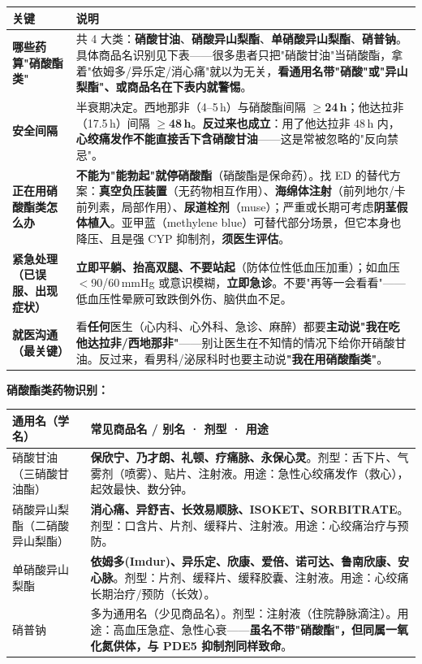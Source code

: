 \documentclass[12pt,UTF8,openany]{ctexbook}
\begin{document}
\begin{tabularx}{\textwidth}{l X}
\toprule
\textbf{关键} & \textbf{说明} \\
\midrule
\textbf{哪些药算"硝酸酯类"} & 共 4 大类：\textbf{硝酸甘油}、\textbf{硝酸异山梨酯}、\textbf{单硝酸异山梨酯}、\textbf{硝普钠}。具体商品名识别见下表——很多患者只把"硝酸甘油"当硝酸酯，拿着"依姆多/异乐定/消心痛"就以为无关，\textbf{看通用名带"硝酸"或"异山梨酯"、或商品名在下表内就警惕}。 \\
\textbf{安全间隔} & 半衰期决定。西地那非（4--5\,h）与硝酸酯间隔\textbf{ $\ge$24\,h}；他达拉非（17.5\,h）间隔\textbf{ $\ge$48\,h}。\textbf{反过来也成立}：用了他达拉非 48\,h 内，\textbf{心绞痛发作不能直接舌下含硝酸甘油}——这是常被忽略的"反向禁忌"。 \\
\textbf{正在用硝酸酯类怎么办} & \textbf{不能为"能勃起"就停硝酸酯}（硝酸酯是保命药）。找 ED 的替代方案：\textbf{真空负压装置}（无药物相互作用）、\textbf{海绵体注射}（前列地尔/卡前列素，局部作用）、\textbf{尿道栓剂}（muse）；严重或长期可考虑\textbf{阴茎假体植入}。亚甲蓝（methylene blue）可替代部分场景，但它本身也降压、且是强 CYP 抑制剂，\textbf{须医生评估}。 \\
\textbf{紧急处理（已误服、出现症状）} & \textbf{立即平躺、抬高双腿、不要站起}（防体位性低血压加重）；如血压 $<$90/60\,mmHg 或意识模糊，\textbf{立即急诊}。不要"再等一会看看"——低血压性晕厥可致跌倒外伤、脑供血不足。 \\
\textbf{就医沟通（最关键）} & 看\textbf{任何}医生（心内科、心外科、急诊、麻醉）都要\textbf{主动说"我在吃他达拉非/西地那非"}——别让医生在不知情的情况下给你开硝酸甘油。反过来，看男科/泌尿科时也要主动说\textbf{"我在用硝酸酯类"}。 \\
\bottomrule
\end{tabularx}

\textbf{硝酸酯类药物识别：}

\begin{tabularx}{\textwidth}{p{3.6cm} X}
\toprule
\textbf{通用名（学名）} & \textbf{常见商品名 / 别名 · 剂型 · 用途} \\
\midrule
硝酸甘油（三硝酸甘油酯） & \textbf{保欣宁、乃才朗、礼顿、疗痛脉、永保心灵}。剂型：舌下片、气雾剂（喷雾）、贴片、注射液。用途：急性心绞痛发作（救心），起效最快、数分钟。 \\
硝酸异山梨酯（二硝酸异山梨酯） & \textbf{消心痛、异舒吉、长效易顺脉、ISOKET、SORBITRATE}。剂型：口含片、片剂、缓释片、注射液。用途：心绞痛治疗与预防。 \\
单硝酸异山梨酯 & \textbf{依姆多(Imdur)、异乐定、欣康、爱倍、诺可达、鲁南欣康、安心脉}。剂型：片剂、缓释片、缓释胶囊、注射液。用途：心绞痛长期治疗/预防（长效）。 \\
硝普钠 & 多为通用名（少见商品名）。剂型：注射液（住院静脉滴注）。用途：高血压急症、急性心衰——\textbf{虽名不带"硝酸酯"，但同属一氧化氮供体，与 PDE5 抑制剂同样致命}。 \\
\bottomrule
\end{tabularx}
\end{document}
